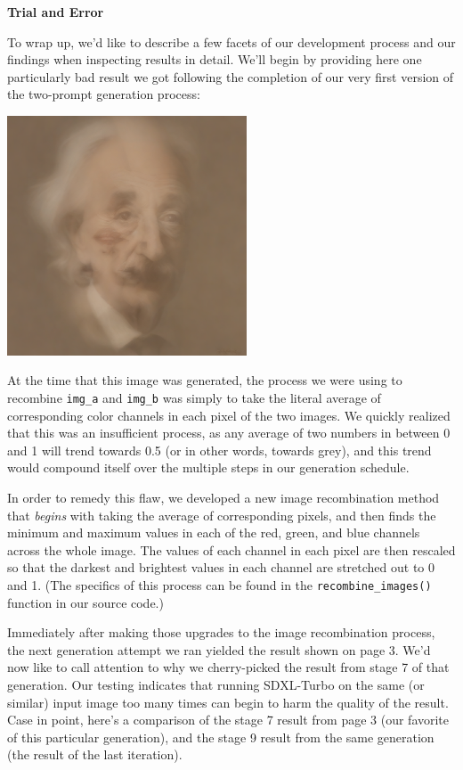 \documentclass[12pt,letterpaper]{article}
\begin{document}
    \noindent\textbf{Trial and Error}\setlength{\parskip}{0pt}

    To wrap up, we'd like to describe a few facets of our development process and our findings when inspecting results in detail. We'll begin by providing here one particularly bad result we got following the completion of our very first version of the two-prompt generation process:

    \noindent\begin{center}
        \includegraphics[width=2.8in]{img_einstein_monroe_muddy.png}
    \end{center}

    At the time that this image was generated, the process we were using to recombine \texttt{img\_a} and \texttt{img\_b} was simply to take the literal average of corresponding color channels in each pixel of the two images. We quickly realized that this was an insufficient process, as any average of two numbers in between 0 and 1 will trend towards 0.5 (or in other words, towards grey), and this trend would compound itself over the multiple steps in our generation schedule.\setlength{\parskip}{12pt}

    In order to remedy this flaw, we developed a new image recombination method that \emph{begins} with taking the average of corresponding pixels, and then finds the minimum and maximum values in each of the red, green, and blue channels across the whole image. The values of each channel in each pixel are then rescaled so that the darkest and brightest values in each channel are stretched out to 0 and 1. (The specifics of this process can be found in the \texttt{recombine\_images()} function in our source code.)

    Immediately after making those upgrades to the image recombination process, the next generation attempt we ran yielded the result shown on page 3. We'd now like to call attention to why we cherry-picked the result from stage 7 of that generation. Our testing indicates that running SDXL-Turbo on the same (or similar) input image too many times can begin to harm the quality of the result. Case in point, here's a comparison of the stage 7 result from page 3 (our favorite of this particular generation), and the stage 9 result from the same generation (the result of the last iteration).
\end{document}
